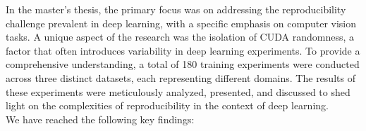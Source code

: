 
In the master's thesis, the primary focus was on addressing the reproducibility challenge prevalent in deep learning, with a specific emphasis on computer vision tasks. A unique aspect of the research was the isolation of CUDA randomness, a factor that often introduces variability in deep learning experiments. To provide a comprehensive understanding, a total of 180 training experiments were conducted across three distinct datasets, each representing different domains. The results of these experiments were meticulously analyzed, presented, and discussed to shed light on the complexities of reproducibility in the context of deep learning.\\

We have reached the following key findings:

